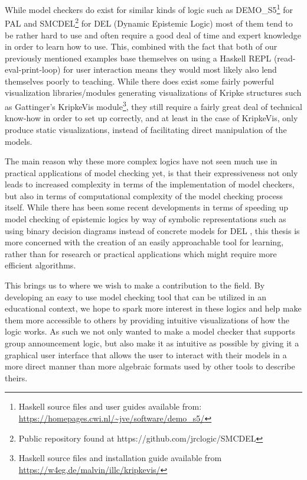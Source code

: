 While model checkers do exist for similar kinds of logic such as DEMO\_S5\footnote{Haskell source files and user guides available from: \url{https://homepages.cwi.nl/~jve/software/demo_s5/}} for PAL and SMCDEL\footnote{Public repository found at https://github.com/jrclogic/SMCDEL} for DEL (Dynamic Epistemic Logic) most of them tend to be rather hard to use and often require a good deal of time and expert knowledge in order to learn how to use. This, combined with the fact that both of our previously mentioned examples base themselves on using a Haskell REPL (read-eval-print-loop) for user interaction means  they would most likely also lend themselves poorly to teaching. While there does exist some fairly powerful visualization libraries/modules generating visualizations of Kripke structures such as Gattinger's KripkeVis module\footnote{Haskell source files and installation guide available from \url{https://w4eg.de/malvin/illc/kripkevis/}}, they still require a fairly great deal of technical know-how in order to set up correctly, and at least in the case of KripkeVis, only produce static visualizations, instead of facilitating direct manipulation of the models.

The main reason why these more complex logics have not seen much use in practical applications of model checking yet, is that their expressiveness not only leads to increased complexity in terms of the implementation of model checkers, but also in terms of computational complexity of the model checking process itself. While there has been some recent developments in terms of speeding up model checking of epistemic logics by way of symbolic representations such as using binary decision diagrams instead of concrete models for DEL \cite{GattingerSMCDELPhD}, this thesis is more concerned with the creation of an easily approachable tool for learning, rather than for research or practical applications which might require more efficient algorithms.


This brings us to where we wish to make a contribution to the field. By developing an easy to use model checking tool that can be utilized in an educational context, we hope to spark more interest in these logics and help make them more accessible to others by providing intuitive visualizations of how the logic works. As such we not only wanted to make a model checker that supports group announcement logic, but also make it as intuitive as possible by giving it a graphical user interface that allows the user to interact with their models in a more direct manner than more algebraic formats used by other tools to describe theirs. 

